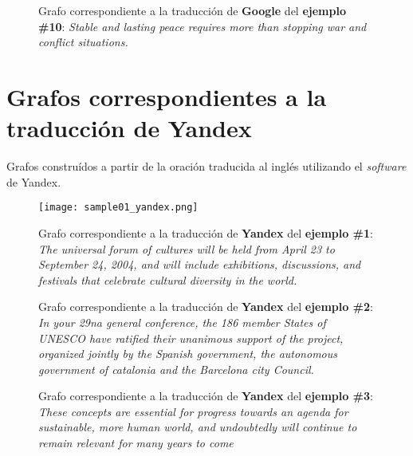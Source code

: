 \documentclass[a4paper,12pt,spanish]{book}
\begin{document}
\begin{figure}[htbp]
\centering
\capstart

\caption[Grafo correspondiente a la traducción de Google del ejemplo \#10.]{Grafo correspondiente a la traducción de \textbf{Google} del \textbf{ejemplo \#10}:
\emph{Stable and lasting peace requires more than stopping war and conflict
situations.}}\label{appendix-data:sample10-google}\end{figure}
\clearpage

\section{Grafos correspondientes a la traducción de Yandex}
\label{appendix-data:grafos-correspondientes-a-la-traduccion-de-yandex}
Grafos construídos a partir de la oración traducida al inglés utilizando
el \emph{software} de Yandex.
\begin{figure}[htbp]
\centering
\capstart

\texttt{[image: sample01\_yandex.png]}
\caption[Grafo correspondiente a la traducción de Yandex del ejemplo \#1.]{Grafo correspondiente a la traducción de \textbf{Yandex} del \textbf{ejemplo \#1}:
\emph{The universal forum of cultures will be held from April 23 to September
24, 2004, and will include exhibitions, discussions, and festivals that
celebrate cultural diversity in the world.}}\label{appendix-data:sample01-yandex}\end{figure}
\begin{figure}[htbp]
\centering
\capstart

\caption[Grafo correspondiente a la traducción de Yandex del ejemplo \#2.]{Grafo correspondiente a la traducción de \textbf{Yandex} del \textbf{ejemplo \#2}:
\emph{In your 29na general conference, the 186 member States of UNESCO have
ratified their unanimous support of the project, organized jointly by
the Spanish government, the autonomous government of catalonia and the
Barcelona city Council.}}\label{appendix-data:sample02-yandex}\end{figure}
\begin{figure}[htbp]
\centering
\capstart

\caption[Grafo correspondiente a la traducción de Yandex del ejemplo \#3.]{Grafo correspondiente a la traducción de \textbf{Yandex} del \textbf{ejemplo \#3}:
\emph{These concepts are essential for progress towards an agenda for sustainable,
more human world, and undoubtedly will continue to remain relevant for
many years to come}}\label{appendix-data:sample03-yandex}\end{figure}
\end{document}
